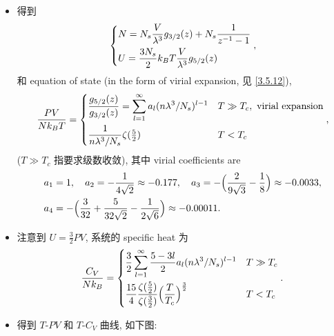 \begin{itemize}
	\item 得到
	\begin{equation}
		\begin{dcases}
			N = N_s \frac{V}{\lambda^3} g_{3 / 2}(z) + N_s \frac{1}{z^{- 1} - 1} \\
			U = \frac{3 N_s}{2} k_B T \frac{V}{\lambda^3} g_{5 / 2}(z)
		\end{dcases},
	\end{equation}
	和 equation of state (in the form of virial expansion, 见 \eqref{3.5.12}),
	\begin{equation}
		\frac{P V}{N k_B T} = \begin{dcases}
			\frac{g_{5 / 2}(z)}{g_{3 / 2}(z)} = \sum_{l = 1}^\infty a_l (n \lambda^3 / N_s)^{l - 1} & T \gg T_c, \ \text{virial expansion} \\
			\frac{1}{n \lambda^3 / N_s} \zeta({\textstyle \frac{5}{2}}) & T < T_c
		\end{dcases},
	\end{equation}
	($T \gg T_c$ 指要求级数收敛), 其中 virial coefficients are
	\begin{align}
		& a_1 = 1, \quad a_2 = - \frac{1}{4 \sqrt{2}} \approx - 0.177, \quad a_3 = - \Big( \frac{2}{9 \sqrt{3}} - \frac{1}{8} \Big) \approx - 0.0033, \notag \\
		& a_4 = - \Big( \frac{3}{32} + \frac{5}{32 \sqrt{2}} - \frac{1}{2 \sqrt{6}} \Big) \approx - 0.00011.
	\end{align}
	
	\item 注意到 $U = \frac{3}{2} P V$, 系统的 specific heat 为
	\begin{equation}
		\frac{C_V}{N k_B} = \begin{dcases}
			\frac{3}{2} \sum_{l = 1}^\infty \frac{5 - 3 l}{2} a_l (n \lambda^3 / N_s)^{l - 1} & T \gg T_c \\
			\frac{15}{4} \frac{\zeta({\textstyle \frac{5}{2}})}{\zeta({\textstyle \frac{3}{2}})} \Big( \frac{T}{T_c} \Big)^{\frac{3}{2}} & T < T_c
		\end{dcases}.
	\end{equation}
	
	\item 得到 $T$-$P V$ 和 $T$-$C_V$ 曲线, 如下图:
	

\end{itemize}
